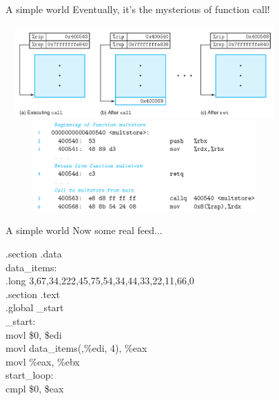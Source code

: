 \documentclass[UKenglish]{beamer}
\begin{document}
   \begin{frame}{A simple world}
     Eventually, it's the mysterious of function call!
     \begin{center}
       \includegraphics[width = 0.8\textwidth, height=3.5cm]{function_tr.png}
       \includegraphics[width = 0.8\textwidth, height=3.5cm]{function_call.png}
     \end{center}
   \end{frame}
   
   

\begin{frame}{A simple world}
  Now some real feed...
  \begin{example}
    .section .data\\
    data\_items:\\
    .long 3,67,34,222,45,75,54,34,44,33,22,11,66,0\\
    .section .text\\
    .global \_start\\
    \_start:\\
    movl \$0, \$edi\\
    movl data\_items(,\%edi, 4), \%eax\\
    movl \%eax, \%ebx\\

    start\_loop:\\
    cmpl \$0, \$eax\\
  \end{example}
\end{frame}
\end{document}
